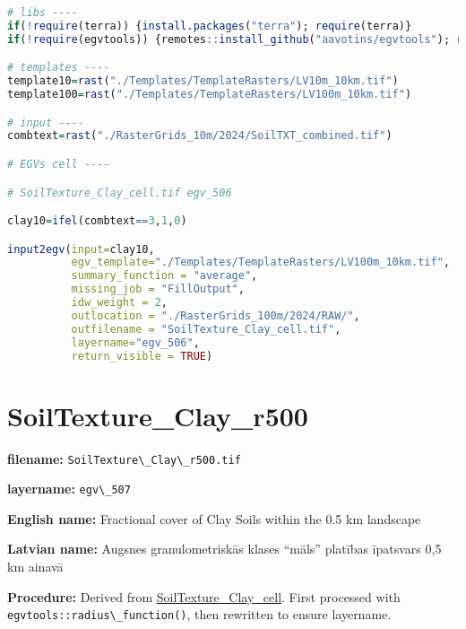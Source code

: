 \documentclass[
]{book}
\newcommand{\passthrough}[1]{#1}
\begin{document}
\begin{lstlisting}[language=R]
# libs ----
if(!require(terra)) {install.packages("terra"); require(terra)}
if(!require(egvtools)) {remotes::install_github("aavotins/egvtools"); require(egvtools)}

# templates ----
template10=rast("./Templates/TemplateRasters/LV10m_10km.tif")
template100=rast("./Templates/TemplateRasters/LV100m_10km.tif")

# input ----
combtext=rast("./RasterGrids_10m/2024/SoilTXT_combined.tif")

# EGVs cell ----

# SoilTexture_Clay_cell.tif egv_506

clay10=ifel(combtext==3,1,0)

input2egv(input=clay10,
          egv_template="./Templates/TemplateRasters/LV100m_10km.tif",
          summary_function = "average",
          missing_job = "FillOutput",
          idw_weight = 2,
          outlocation = "./RasterGrids_100m/2024/RAW/",
          outfilename = "SoilTexture_Clay_cell.tif",
          layername="egv_506",
          return_visible = TRUE)
\end{lstlisting}

\section{SoilTexture\_Clay\_r500}\label{ch06.507}

\textbf{filename:} \passthrough{\lstinline!SoilTexture\_Clay\_r500.tif!}

\textbf{layername:} \passthrough{\lstinline!egv\_507!}

\textbf{English name:} Fractional cover of Clay Soils within the 0.5 km landscape

\textbf{Latvian name:} Augsnes granulometriskās klases ``māls'' platības īpatsvars 0,5 km ainavā

\textbf{Procedure:} Derived from \hyperref[ch06.506]{SoilTexture\_Clay\_cell}. First processed
with \passthrough{\lstinline!egvtools::radius\_function()!}, then rewritten to ensure layername.
\end{document}
